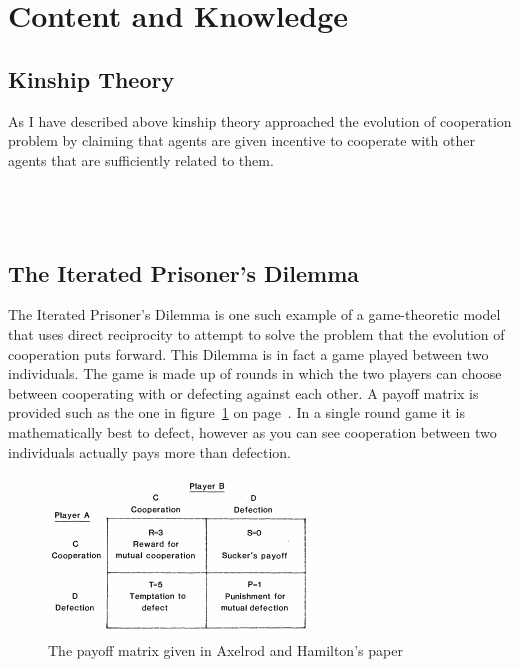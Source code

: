 \documentclass[twoside,twocolumn]{article}
\begin{document}

\section{Content and Knowledge}
\subsection{Kinship Theory}
As I have described above kinship theory approached the evolution of cooperation problem by claiming that agents are given incentive to cooperate with other agents that are sufficiently related to them. \\

~\cite{ethnicselection}\\
~\cite{evolution_of_cooperation}\\
~\cite{kinhamilton}\\




\subsection{The Iterated Prisoner's Dilemma}
The Iterated Prisoner's Dilemma is one such example of a game-theoretic model that uses direct reciprocity to attempt to solve the problem that the evolution of cooperation puts forward. This Dilemma is in fact a game played between two individuals. The game is made up of rounds in which the two players can choose between cooperating with or defecting against each other. A payoff matrix is provided such as the one in figure~\ref{fig:payoffmatrix} on page~\pageref{fig:payoffmatrix}. In a single round game it is mathematically best to defect, however as you can see cooperation between two individuals actually pays more than defection.
\begin{figure}
	\includegraphics[scale=1]{payoffmatrix.png}
	\caption{The payoff matrix given in Axelrod and Hamilton's paper~\cite{evolution_of_cooperation}}
	\label{fig:payoffmatrix}
\end{figure}
\end{document}
